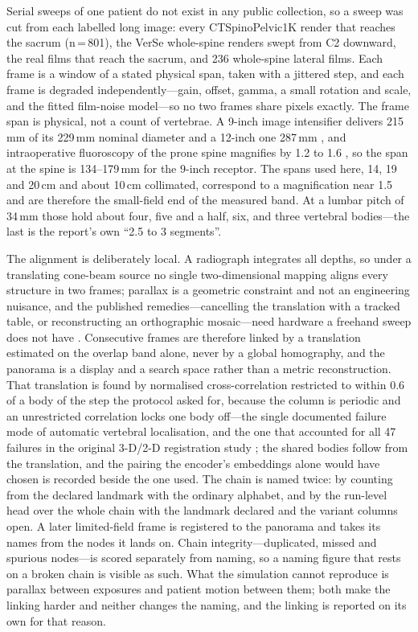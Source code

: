 \documentclass[11pt,letterpaper]{article}
\begin{document}
Serial sweeps of one patient do not exist in any public collection, so a sweep was cut from each labelled long image: every CTSpinoPelvic1K render that reaches the sacrum (n\,=\,801), the VerSe whole-spine renders swept from C2 downward, the real films that reach the sacrum, and 236 whole-spine lateral films. Each frame is a window of a stated physical span, taken with a jittered step, and each frame is degraded independently---gain, offset, gamma, a small rotation and scale, and the fitted film-noise model---so no two frames share pixels exactly. The frame span is physical, not a count of vertebrae. A 9-inch image intensifier delivers 215\,mm of its 229\,mm nominal diameter and a 12-inch one 287\,mm \citep{ge_k170752}, and intraoperative fluoroscopy of the prone spine magnifies by 1.2 to 1.6 \citep{naik2022}, so the span at the spine is 134--179\,mm for the 9-inch receptor. The spans used here, 14, 19 and 20\,cm and about 10\,cm collimated, correspond to a magnification near 1.5 and are therefore the small-field end of the measured band. At a lumbar pitch of 34\,mm those hold about four, five and a half, six, and three vertebral bodies---the last is the report's own ``2.5 to 3 segments''.

The alignment is deliberately local. A radiograph integrates all depths, so under a translating cone-beam source no single two-dimensional mapping aligns every structure in two frames; parallax is a geometric constraint and not an engineering nuisance, and the published remedies---cancelling the translation with a tracked table, or reconstructing an orthographic mosaic---need hardware a freehand sweep does not have \citep{fotouhi2021}. Consecutive frames are therefore linked by a translation estimated on the overlap band alone, never by a global homography, and the panorama is a display and a search space rather than a metric reconstruction. That translation is found by normalised cross-correlation restricted to within 0.6 of a body of the step the protocol asked for, because the column is periodic and an unrestricted correlation locks one body off---the single documented failure mode of automatic vertebral localisation, and the one that accounted for all 47 failures in the original 3-D/2-D registration study \citep{otake2012fail}; the shared bodies follow from the translation, and the pairing the encoder's embeddings alone would have chosen is recorded beside the one used. The chain is named twice: by counting from the declared landmark with the ordinary alphabet, and by the run-level head over the whole chain with the landmark declared and the variant columns open. A later limited-field frame is registered to the panorama and takes its names from the nodes it lands on. Chain integrity---duplicated, missed and spurious nodes---is scored separately from naming, so a naming figure that rests on a broken chain is visible as such. What the simulation cannot reproduce is parallax between exposures and patient motion between them; both make the linking harder and neither changes the naming, and the linking is reported on its own for that reason.
\end{document}
